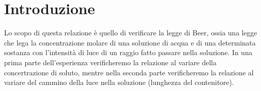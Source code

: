 \section{Introduzione}

Lo scopo di questa relazione è quello di verificare la legge di Beer, ossia una legge che lega la concentrazione molare di una soluzione di acqua e di una determinata sostanza con l'intensità di luce di un raggio fatto passare nella soluzione. In una prima parte dell'esperienza verificheremo la relazione al variare della concertrazione di soluto, mentre nella seconda parte verificheremo la relazione al variare del cammino della luce nella soluzione (lunghezza del contenitore).